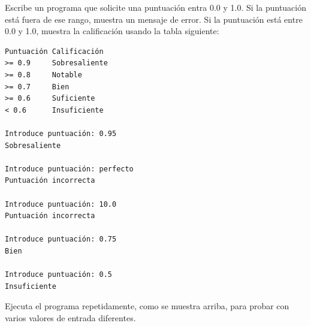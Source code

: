 \begin{ex}
Escribe un programa que solicite una puntuación entra 0.0 y 1.0.
Si la puntuación está fuera de ese rango, muestra un mensaje de error.
Si la puntuación está entre 0.0 y 1.0, muestra la calificación usando la tabla
siguiente:

\begin{verbatim}
Puntuación Calificación
>= 0.9     Sobresaliente
>= 0.8     Notable
>= 0.7     Bien
>= 0.6     Suficiente
< 0.6      Insuficiente

Introduce puntuación: 0.95
Sobresaliente

Introduce puntuación: perfecto
Puntuación incorrecta

Introduce puntuación: 10.0
Puntuación incorrecta

Introduce puntuación: 0.75
Bien

Introduce puntuación: 0.5
Insuficiente
\end{verbatim}

Ejecuta el programa repetidamente, como se muestra arriba, para probar
con varios valores de entrada diferentes.
\end{ex}

